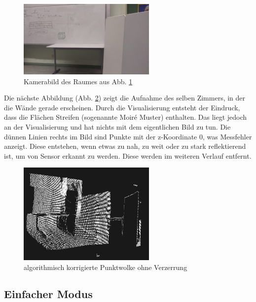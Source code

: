\documentclass[a4paper,12pt,ngerman]{scrartcl}
\begin{document}
\begin{figure}[H]
	\centering
	\includegraphics[angle=180,width=0.6\textwidth]{20180125_171703}
	\caption{Kamerabild des Raumes aus Abb. \ref{room_at_school}}
	\label{room_at_school}
\end{figure} \par
Die nächste Abbildung (Abb. \ref{before_filtering}) zeigt
die Aufnahme des selben Zimmers, in der die Wände gerade erscheinen. Durch die Visualisierung entsteht
der Eindruck, dass die Flächen Streifen (sogenannte Moir\'{e} Muster) enthalten. Das liegt jedoch an der
Visualisierung und hat nichts mit dem eigentlichen Bild zu tun. Die dünnen Linien rechts im Bild sind Punkte
mit der z-Koordinate 0, was Messfehler anzeigt. Diese entstehen, wenn etwas zu nah, zu weit oder zu stark
reflektierend ist, um von Sensor erkannt zu werden. Diese werden im weiteren Verlauf entfernt.
\begin{figure}[H]
	\centering
	\includegraphics[width=0.6\textwidth]{before_filtering}
	\caption{algorithmisch korrigierte Punktwolke ohne Verzerrung}
	\label{before_filtering}
\end{figure} 

\subsection{Einfacher Modus}
\end{document}
